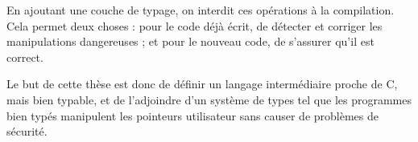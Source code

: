 En ajoutant une couche de typage, on interdit ces opérations à la compilation.
Cela permet deux choses : pour le code déjà écrit, de détecter et corriger les
manipulations dangereuses ; et pour le nouveau code, de s'assurer qu'il est
correct.

Le but de cette thèse est donc de définir un langage intermédiaire proche de C,
mais bien typable, et de l'adjoindre d'un système de types tel que les
programmes bien typés manipulent les pointeurs utilisateur sans causer de
problèmes de sécurité.



